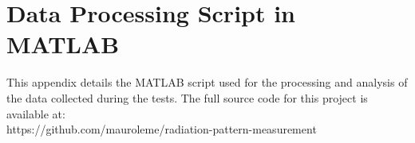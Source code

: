 \chapter{Data Processing Script in MATLAB}
\label{apendice1}

This appendix details the MATLAB script used for the processing and analysis of the data collected during the tests. The full source code for this project is available at:\\ https://github.com/mauroleme/radiation-pattern-measurement


